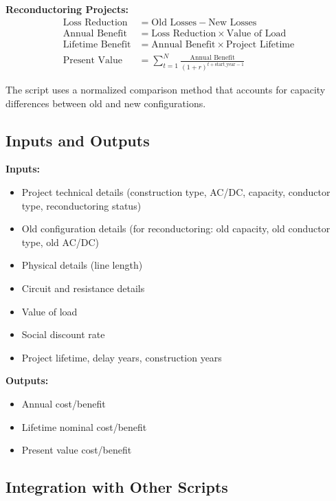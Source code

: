 \documentclass[ctcc_full_documentation.tex]{subfiles}
\begin{document}
\textbf{Reconductoring Projects:}
\begin{align}
\text{Loss Reduction} &= \text{Old Losses} - \text{New Losses} \\
\text{Annual Benefit} &= \text{Loss Reduction} \times \text{Value of Load} \\
\text{Lifetime Benefit} &= \text{Annual Benefit} \times \text{Project Lifetime} \\
\text{Present Value} &= \sum_{t=1}^{N} \frac{\text{Annual Benefit}}{(1 + r)^{t + \text{start\_year} - 1}}
\end{align}

The script uses a normalized comparison method that accounts for capacity differences between old and new configurations.

\subsection{Inputs and Outputs}

\textbf{Inputs:}
\begin{itemize}
    \item Project technical details (construction type, AC/DC, capacity, conductor type, reconductoring status)
    \item Old configuration details (for reconductoring: old capacity, old conductor type, old AC/DC)
    \item Physical details (line length)
    \item Circuit and resistance details
    \item Value of load
    \item Social discount rate
    \item Project lifetime, delay years, construction years
\end{itemize}

\textbf{Outputs:}
\begin{itemize}
    \item Annual cost/benefit
    \item Lifetime nominal cost/benefit
    \item Present value cost/benefit
\end{itemize}

\subsection{Integration with Other Scripts}
\end{document}
